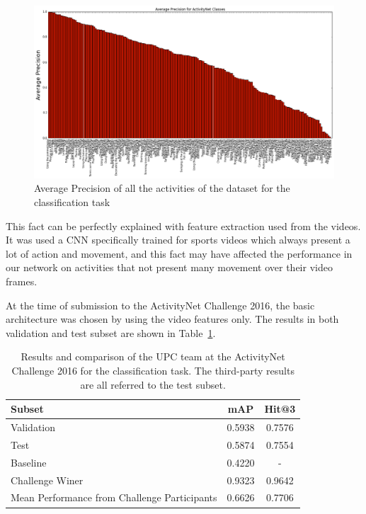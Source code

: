 
\begin{figure}[H]
\begin{center}
\includegraphics[width=1\linewidth]{img/results/ap_by_activity_classification}
\end{center}
\caption{Average Precision of all the activities of the dataset for the classification task}
\label{fig:ap_by_activity_classification}
\end{figure}

This fact can be perfectly explained with feature extraction used from the videos. It was used a CNN specifically trained for sports videos which always present a lot of action and movement, and this fact may have affected the performance in our network on activities that not present many movement over their video frames.

At the time of submission to the ActivityNet Challenge 2016, the basic architecture was chosen by using the video features only. The results in both validation and test subset are shown in Table~\ref{table:classification_results_challenge}.

\begin{table}[H]
\begin{center}
\begin{tabular}{|l|c|c|}
\hline
Subset & mAP & Hit@3 \\
\hline\hline
Validation & 0.5938 & 0.7576 \\
Test & 0.5874 & 0.7554 \\
\hline\hline
Baseline~\cite{caba2015activitynet} & 0.4220 & - \\
Challenge Winer~\cite{WangQT15action,2015arXiv150702159W} & 0.9323 & 0.9642 \\
Mean Performance from Challenge Participants & 0.6626 & 0.7706 \\
\hline
\end{tabular}
\end{center}
\caption{Results and comparison of the UPC team at the ActivityNet Challenge 2016 for the classification task. The third-party results are all referred to the test subset.}
\label{table:classification_results_challenge}
\end{table}

